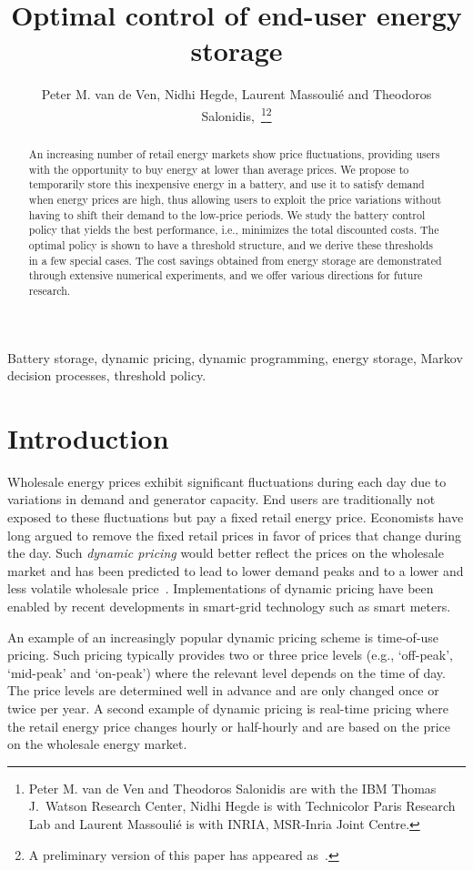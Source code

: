 \documentclass[journal]{IEEEtran}
\title{Optimal control of end-user energy storage}
\author{Peter M. van de Ven, Nidhi Hegde, Laurent Massouli\'e and Theodoros Salonidis,~\IEEEmembership{Member,~IEEE}\thanks{Peter M. van de Ven and Theodoros Salonidis are with the IBM Thomas J.\ Watson Research Center, Nidhi Hegde is with Technicolor Paris Research Lab and Laurent Massouli\'e is with INRIA, MSR-Inria Joint Centre.}\thanks{A preliminary version of this paper has appeared as~\cite{VHMS11}.}
}
\newcommand\1{\mathbf{1}}
\begin{document}
\maketitle


\begin{abstract}
An increasing number of retail energy markets show price fluctuations, providing users with the opportunity to buy energy at lower than average prices. We propose to temporarily store this inexpensive energy in a battery, and use it to satisfy demand when energy prices are high, thus allowing users to exploit the price variations without having to shift their demand to the low-price periods. We study the battery control policy that yields the best performance, i.e., minimizes the total discounted costs. The optimal policy is shown to have a threshold structure, and we derive these thresholds in a few special cases. The cost savings obtained from energy storage are demonstrated through extensive numerical experiments, and we offer various directions for future research.
\end{abstract}


\begin{IEEEkeywords}
Battery storage, dynamic pricing, dynamic programming, energy storage, Markov decision processes, threshold policy.
\end{IEEEkeywords}

\section{Introduction}\label{sec:intro}


Wholesale energy prices exhibit significant fluctuations during each day due to variations in demand and generator capacity. End users are traditionally not exposed to these fluctuations but pay a fixed retail energy price. Economists have long argued to remove the fixed retail prices in favor of prices that change during the day. Such {\em dynamic pricing} would better reflect the prices on the wholesale market and has been predicted to lead to lower demand peaks and to a lower and less volatile wholesale price~\cite{Borenstein05}. Implementations of dynamic pricing have been enabled by recent developments in smart-grid technology such as smart meters.

An example of an increasingly popular dynamic pricing scheme
is time-of-use pricing. Such pricing typically provides two
or three price levels (e.g., `off-peak', `mid-peak' and `on-peak') where the relevant level
depends on the time of day. The price levels are determined well in advance and are
only changed once or twice per year. A second example of dynamic
pricing is real-time pricing where the retail energy price
changes hourly or half-hourly and are based on the price on the wholesale energy market.
\end{document}
